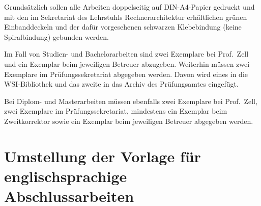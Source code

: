Grundsätzlich sollen alle Arbeiten doppelseitig auf DIN-A4-Papier gedruckt und
mit den im Sekretariat des Lehrstuhls Rechnerarchitektur erhältlichen grünen
Einbanddeckeln und der dafür vorgesehenen schwarzen Klebebindung (keine
Spiralbindung) gebunden werden.

Im Fall von Studien- und Bachelorarbeiten sind zwei Exemplare bei Prof.~Zell und
ein Exemplar beim jeweiligen Betreuer abzugeben. Weiterhin müssen zwei Exemplare
im Prüfungssekretariat abgegeben werden. Davon wird eines in die WSI-Bibliothek
und das zweite in das Archiv des Prüfungsamtes eingefügt.

Bei Diplom- und Masterarbeiten müssen ebenfalls zwei Exemplare bei Prof.~Zell,
zwei Exemplare im Prüfungssekretariat, mindestens ein Exemplar beim
Zweitkorrektor sowie ein Exemplar beim jeweiligen Betreuer abgegeben werden.


\section{Umstellung der Vorlage für englischsprachige Abschlussarbeiten}

